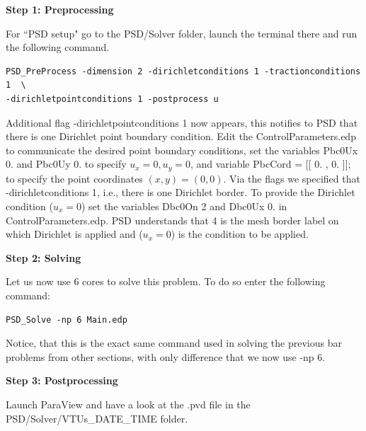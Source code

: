 \textbf{Step 1: Preprocessing}

For ``PSD setup" go to the {\ttfamily PSD/Solver} folder, launch the terminal there and run the following command.
\begin{lstlisting}[style=Linux]
PSD_PreProcess -dimension 2 -dirichletconditions 1 -tractionconditions 1  \ 
-dirichletpointconditions 1 -postprocess u
\end{lstlisting}

Additional flag {\ttfamily -dirichletpointconditions 1} now appears, this notifies to PSD that there is one Dirichlet point boundary condition. Edit the  {\ttfamily ControlParameters.edp} to communicate the desired point boundary conditions, set the variables {\ttfamily Pbc0Ux  0.} and {\ttfamily Pbc0Uy  0.} to specify $u_x=0,u_y=0$, and variable {\ttfamily PbcCord = [[  0. , 0. ]];} to specify the point coordinates $(x,y)=(0,0)$. Via the flags we specified that {\ttfamily -dirichletconditions 1}, i.e., there is one Dirichlet border.
To provide the Dirichlet condition ($u_x=0$) set the variables {\ttfamily Dbc0On 2} and {\ttfamily Dbc0Ux 0.}  in {\ttfamily ControlParameters.edp}. PSD understands that 4 is the mesh border label on which Dirichlet is applied and ($u_x=0$) is the condition to be applied.

\textbf{Step 2: Solving}

Let us now use 6 cores to solve this problem. To do so enter the following command:

\begin{lstlisting}[style=Linux]
PSD_Solve -np 6 Main.edp
\end{lstlisting}
%
Notice, that this is the exact same command used in solving the previous bar problems from other sections, with only difference that we now use {\ttfamily -np 6}.


\textbf{Step 3: Postprocessing}

Launch ParaView and have a look at the  {\ttfamily .pvd} file in the  {\ttfamily PSD/Solver/VTUs\_DATE\_TIME} folder. 

